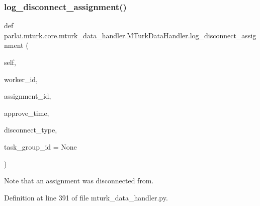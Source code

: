 \subsubsection{\texorpdfstring{log\+\_\+disconnect\+\_\+assignment()}{log\_disconnect\_assignment()}}
{\footnotesize\ttfamily def parlai.\+mturk.\+core.\+mturk\+\_\+data\+\_\+handler.\+M\+Turk\+Data\+Handler.\+log\+\_\+disconnect\+\_\+assignment (\begin{DoxyParamCaption}\item[{}]{self,  }\item[{}]{worker\+\_\+id,  }\item[{}]{assignment\+\_\+id,  }\item[{}]{approve\+\_\+time,  }\item[{}]{disconnect\+\_\+type,  }\item[{}]{task\+\_\+group\+\_\+id = {\ttfamily None} }\end{DoxyParamCaption})}

\begin{DoxyVerb}Note that an assignment was disconnected from.
\end{DoxyVerb}
 

Definition at line 391 of file mturk\+\_\+data\+\_\+handler.\+py.


